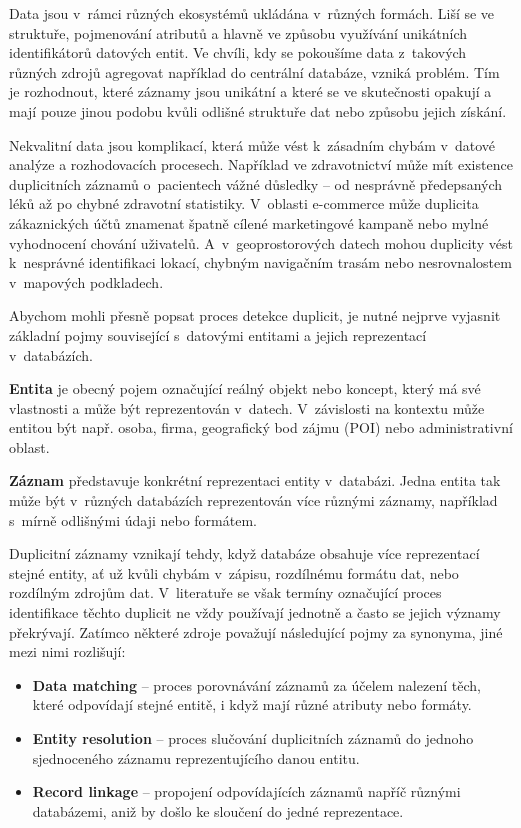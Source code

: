 Data jsou v~rámci různých ekosystémů ukládána v~různých formách. Liší se ve struktuře, pojmenování atributů a hlavně ve způsobu využívání unikátních identifikátorů datových entit. Ve chvíli, kdy se pokoušíme data z~takových různých zdrojů agregovat například do centrální databáze, vzniká problém. Tím je rozhodnout, které záznamy jsou unikátní a které se ve skutečnosti opakují a mají pouze jinou podobu kvůli odlišné struktuře dat nebo způsobu jejich získání.

Nekvalitní data jsou komplikací, která může vést k~zásadním chybám v~datové analýze a rozhodovacích procesech. Například ve zdravotnictví může mít existence duplicitních záznamů o~pacientech vážné důsledky – od nesprávně předepsaných léků až po chybné zdravotní statistiky.\cite{bess_problem_2024} V~oblasti e-commerce může duplicita zákaznických účtů znamenat špatně cílené marketingové kampaně nebo mylné vyhodnocení chování uživatelů.\cite{brown_8_2019} A~v~geoprostorových datech mohou duplicity vést k~nesprávné identifikaci lokací, chybným navigačním trasám nebo nesrovnalostem v~mapových podkladech.

Abychom mohli přesně popsat proces detekce duplicit, je nutné nejprve vyjasnit základní pojmy související s~datovými entitami a jejich reprezentací v~databázích.

\textbf{Entita} je obecný pojem označující reálný objekt nebo koncept, který má své vlastnosti a může být reprezentován v~datech. V~závislosti na kontextu může entitou být např. osoba, firma, geografický bod zájmu (POI) nebo administrativní oblast.

\textbf{Záznam} představuje konkrétní reprezentaci entity v~databázi. Jedna entita tak může být v~různých databázích reprezentován více různými záznamy, například s~mírně odlišnými údaji nebo formátem.

Duplicitní záznamy vznikají tehdy, když databáze obsahuje více reprezentací stejné entity, ať už kvůli chybám v~zápisu, rozdílnému formátu dat, nebo rozdílným zdrojům dat. V~literatuře se však termíny označující proces identifikace těchto duplicit ne vždy používají jednotně a často se jejich významy překrývají. Zatímco některé zdroje považují následující pojmy za synonyma, jiné mezi nimi rozlišují:

\begin{itemize}
  \item \textbf{Data matching} – proces porovnávání záznamů za účelem nalezení těch, které odpovídají stejné entitě, i když mají různé atributy nebo formáty. \cite{christen_data_2012}
  \item \textbf{Entity resolution} – proces slučování duplicitních záznamů do jednoho sjednoceného záznamu reprezentujícího danou entitu. \cite{quantexa_what_2024}
  \item \textbf{Record linkage} – propojení odpovídajících záznamů napříč různými databázemi, aniž by došlo ke sloučení do jedné reprezentace. \cite{stepanenko_what_2024}
\end{itemize}

